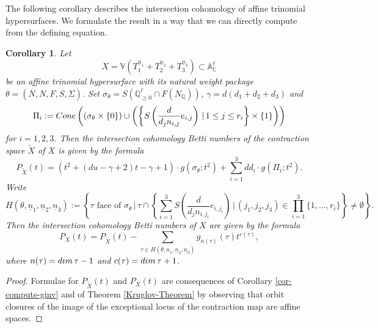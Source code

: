 \documentclass[11pt, reqno]{amsart}
\theoremstyle{plain}
\newtheorem{corollary}[theorem]{Corollary}
\theoremstyle{definition}
\theoremstyle{remark}
\begin{document}
The following corollary describes the intersection cohomology of affine trinomial hypersurfaces. We formulate
the result in a way that we can directly compute from the defining equation.
\begin{corollary}\label{cor-trinome}
Let $$X  =  \mathbb{V}(T_{1}^{\underline{n}_{1}} + T_{2}^{\underline{n}_{2}} + T_{3}^{\underline{n}_{3}}) \subset \mathbb{A}_{\mathbb{C}}^{\ell}$$
be an affine trinomial hypersurface with its natural weight package $\theta =  (\overline{N}, N, F, S, \Sigma)$.
Set $\sigma_{\theta} = S(\mathbb{Q}_{\geq 0}^{\ell}\cap F(N_{\mathbb{Q}}))$, $\gamma =  d(d_{1} + d_{2} + d_{3})$
and $$\Pi_{i} := {\rm Cone}\left( (\sigma_{\theta}\times \{0\})\cup \left(\left\{ S\left( \frac{d}{d_{j} n_{i,j}}e_{i,j}\right)\,|\, 1\leq j\leq r_{i}\right\}\times\{1\}\right)\right)$$
for $i = 1, 2, 3$. Then the intersection cohomology Betti numbers of the contraction space $\widetilde{X}$ of $X$ is given by the formula
$$P_{\widetilde{X}}(t) =  \left(t^{2} + (du - \gamma + 2)t - \gamma + 1\right)\cdot g(\sigma_{\theta}; t^{2}) +  \sum_{i = 1}^{3} dd_{i}\cdot g(\Pi_{i}; t^{2}).$$   
Write 
$$H(\theta, \underline{n}_{1},\underline{n}_{2},\underline{n}_{3}):= \left\{\tau \text{ face of }\sigma_{\theta}\,|\, \tau\cap \left\{\sum_{i =  1}^{3} S\left( \frac{d}{d_{j} n_{i,j_{i}}}e_{i,j_{i}}\right)\,|\, (j_{1}, j_{2}, j_{3})\in \prod_{i = 1}^{3}\{1, \ldots, r_{i}\}\right\} \neq \emptyset\right\}.$$
Then the intersection cohomology Betti numbers of $X$ are given by the formula
$$P_{X}(t)  = P_{\widetilde{X}}(t)  -  \sum_{\tau \in H(\theta, \underline{n}_{1},\underline{n}_{2},\underline{n}_{3})} g_{n(\tau)}(\tau) t^{c(\tau)}, $$
where $n(\tau) =  {\rm dim}\, \tau - 1$ and $c(\tau) =  {\rm dim}\, \tau +1$.    
\end{corollary}
\begin{proof}
Formulae for $P_{\widetilde{X}}(t)$ and $P_{X}(t)$ are consequences of Corollary \ref{cor-compute-ginv} and of Theorem \ref{Kruglov-Theorem} by observing that orbit closures of the image of the exceptional locus of the contraction map are affine spaces.
\end{proof}
\end{document}
